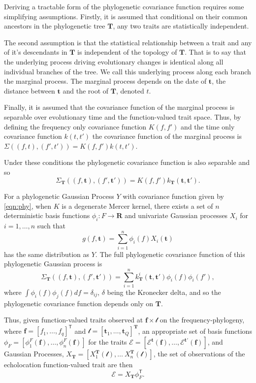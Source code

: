 \documentclass[wsdraft]{ws-rv9x6} %
\begin{document}
Deriving a tractable form of the phylogenetic covariance function requires some simplifying assumptions. Firstly, it is assumed that conditional on their common ancestors in the phylogenetic tree \(\mathbf{T}\), any two traits are statistically independent. 

The second assumption is that the statistical relationship between a trait and any of it's descendants in \(\mathbf{T}\) is independent of the topology of \(\mathbf{T}\). That is to say that the underlying process driving evolutionary changes is identical along all individual branches of the tree. We call this underlying process along each branch the marginal process. The marginal process depends on the date of \(\mathbf{t}\), the distance between \(\mathbf{t}\) and the root of \(\mathbf{T}\), denoted \(t\). 

Finally, it is assumed that the covariance function of the marginal process is separable over evolutionary time and the function-valued trait space. Thus, by defining the frequency only covariance function \(K(f,f')\) and the time only covariance function \(k(t,t')\) the covariance function of the marginal process is \(\Sigma\left((f,t), (f',t')\right) = K(f, f') k(t,t')\).

Under these conditions the phylogenetic covariance function is also separable and so
\begin{equation}
\Sigma_{\mathbf{T}}\left((f,\mathbf{t}), (f',\mathbf{t}')\right) = K(f, f') k_{\mathbf{T}}(\mathbf{t},\mathbf{t}').
\label{eqn:phy}
\end{equation}

For a phylogenetic Gaussian Process \(Y\) with covariance function given by \ref{eqn:phy}, when \(K\) is a degenerate Mercer kernel, there exists a set of \(n\) deterministic basis functions \(\phi_i: F \to \mathbf{R}\) and univariate Gaussian processes \(X_i\) for \(i = 1,\dots, n\) such that 
\[
g(f, \mathbf{t}) = \sum_{i = 1}^{n} \phi_i(f) X_i(\mathbf{t})
\] 
has the same distribution as \(Y\). The full phylogenetic covariance function of this phylogenetic Gaussian process is
\[
\Sigma_{\mathbf{T}}((f, \mathbf{t}), (f', \mathbf{t}')) = \sum_{i = 1}^{n}  k_{\mathbf{T}}^i(\mathbf{t}, \mathbf{t}') \phi_i(f) \phi_i(f'),
\]
where \(\int \phi_i(f) \phi_j(f) df = \delta_{ij}\), \(\delta\) being the Kronecker delta, and so the phylogenetic covariance function depends only on \(\mathbf{T}\). 

Thus, given function-valued traits observed at \(\mathbf{f} \times \mathcal{t}\) on the frequency-phylogeny, where \(\mathbf{f} = [f_1, \dots, f_q]^{\mathsf{T}}\) and \(\mathcal{t} = [\mathbf{t}_1, \dots, \mathbf{t}_Q]^{\mathbf{T}}\), an appropriate set of basis functions \(\phi_{F} = [\phi^{F}_1(\mathbf{f}), \dots, \phi^{F}_n(\mathbf{f})]\) for the traits \(\mathcal{E} = [\mathcal{E}^{\mathbf{t}}(\mathbf{f}), \dots, \mathcal{E}^{\mathbf{t}'}(\mathbf{f})]\), and Gaussian Processes, \(X_{\mathbf{T}} = [X_1^{\mathbf{T}}(\mathcal{t}), \dots\ X_n^{\mathbf{T}}(\mathcal{t})]\), the set of observations of the echolocation function-valued trait are then 
\begin{equation}
\mathcal{E} = X_{\mathbf{T}} \phi_F^{\mathsf{T}}.
\label{eqn:inv}
\end{equation}
\end{document}
